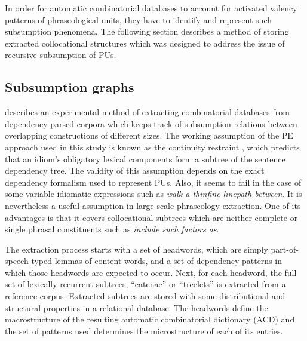 \documentclass[output=paper]{langscibook}
\begin{document}
In order for automatic combinatorial databases to account for activated valency patterns of phraseological units, they have to identify and represent such subsumption phenomena. The following section describes a method of storing extracted collocational structures which was designed to address the issue of recursive subsumption of PUs. 

\subsection{Subsumption graphs}

\citet{Pęzik2018} describes an experimental method of extracting combinatorial databases from dependency-parsed corpora which keeps track of subsumption relations between overlapping constructions of different sizes. The working assumption of the PE approach used in this study is known as the continuity restraint \citep{OGrady1998}, which predicts that an idiom’s obligatory lexical components form a subtree of the sentence dependency tree. The validity of this assumption depends on the exact dependency formalism used to represent PUs. Also, it seems to fail in the case of some variable idiomatic expressions such as \textit{walk a thin{\textbar}fine line{\textbar}path between}. It is nevertheless a useful assumption in large-scale phraseology extraction. One of its advantages is that it covers collocational subtrees which are neither complete or single phrasal constituents such as \textit{include such factors as}. 

The extraction process starts with a set of headwords, which are simply part-of-speech typed lemmas of content words, and a set of dependency patterns in which those headwords are expected to occur. Next, for each headword, the full set of lexically recurrent subtrees, ``catenae'' \citep{OsborneEtAl2012} or ``treelets'' is extracted from a reference corpus. Extracted subtrees are stored with some distributional and structural properties in a relational database. The headwords define the macrostructure of the resulting automatic combinatorial dictionary (ACD) and the set of patterns used determines the microstructure of each of its entries.
\end{document}

